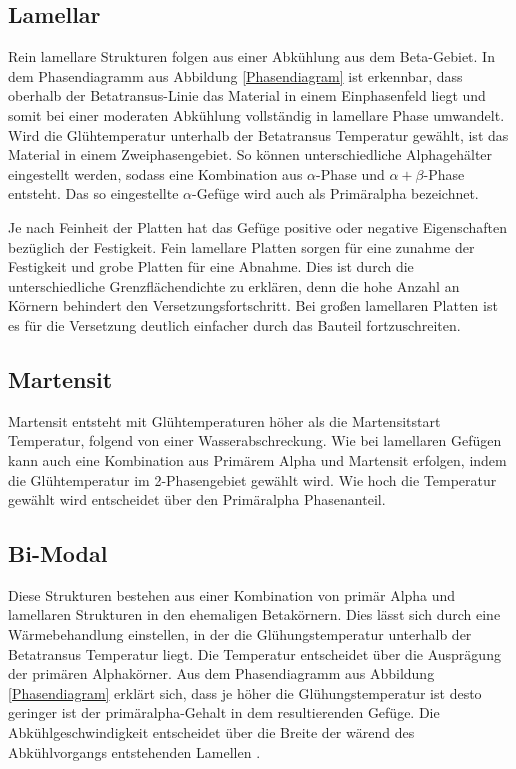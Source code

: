 \documentclass[a4paper, 11pt]{tubsreprt}
\begin{document}
\subsection{Lamellar}
Rein lamellare Strukturen folgen aus einer Abkühlung aus dem Beta-Gebiet. In dem Phasendiagramm aus Abbildung \ref{Phasendiagram} ist erkennbar, dass oberhalb der Betatransus-Linie das Material in einem Einphasenfeld liegt und somit bei einer moderaten Abkühlung vollständig in lamellare Phase umwandelt. Wird die Glühtemperatur unterhalb der Betatransus Temperatur gewählt, ist das Material in einem Zweiphasengebiet. So können unterschiedliche Alphagehälter eingestellt werden, sodass eine Kombination aus $\alpha$-Phase und $\alpha + \beta$-Phase entsteht. Das so eingestellte $\alpha$-Gefüge wird auch als Primäralpha bezeichnet. 


Je nach Feinheit der Platten hat das Gefüge positive oder negative Eigenschaften bezüglich der Festigkeit. Fein lamellare Platten sorgen für eine zunahme der Festigkeit und grobe Platten für eine Abnahme. Dies ist durch die unterschiedliche Grenzflächendichte zu erklären, denn die hohe Anzahl an Körnern behindert den Versetzungsfortschritt. Bei großen lamellaren Platten ist es für die Versetzung deutlich einfacher durch das Bauteil fortzuschreiten. 

\subsection{Martensit}
Martensit entsteht mit Glühtemperaturen höher als die Martensitstart Temperatur, folgend von einer Wasserabschreckung. Wie bei lamellaren Gefügen kann auch eine Kombination aus Primärem Alpha und Martensit erfolgen, indem die Glühtemperatur im 2-Phasengebiet gewählt wird. Wie hoch die Temperatur gewählt wird entscheidet über den Primäralpha Phasenanteil.

\subsection{Bi-Modal}
Diese Strukturen bestehen aus einer Kombination von primär Alpha und lamellaren Strukturen in den ehemaligen Betakörnern. Dies lässt sich durch eine Wärmebehandlung einstellen, in der die Glühungstemperatur unterhalb der Betatransus Temperatur liegt. Die Temperatur entscheidet über die Ausprägung der primären Alphakörner. Aus dem Phasendiagramm aus Abbildung \ref{Phasendiagram} erklärt sich, dass je höher die Glühungstemperatur ist desto geringer ist der primäralpha-Gehalt in dem resultierenden Gefüge. Die Abkühlgeschwindigkeit entscheidet über die Breite der wärend des Abkühlvorgangs entstehenden Lamellen \cite{Luetjering2007}.
\end{document}
